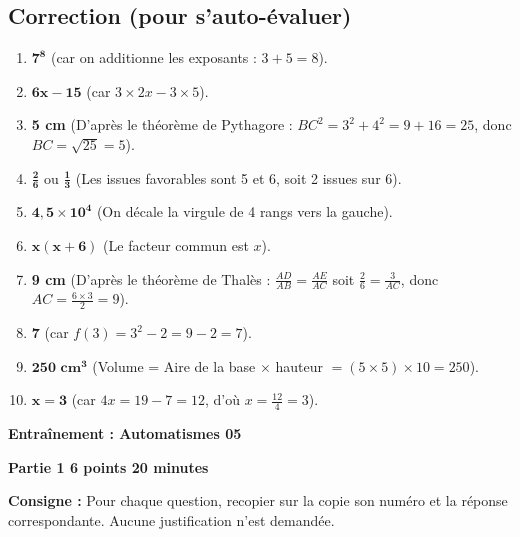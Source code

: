 \documentclass[a4paper,11pt]{article}
\begin{document}
\subsection*{Correction (pour s'auto-évaluer)}
\begin{enumerate}[label=\textbf{\arabic*.}]
    \item $\mathbf{7^8}$ (car on additionne les exposants : $3 + 5 = 8$).
    \item $\mathbf{6x - 15}$ (car $3 \times 2x - 3 \times 5$).
    \item \textbf{5 cm} (D'après le théorème de Pythagore : $BC^2 = 3^2 + 4^2 = 9 + 16 = 25$, donc $BC = \sqrt{25} = 5$).
    \item $\mathbf{\frac{2}{6}}$ ou $\mathbf{\frac{1}{3}}$ (Les issues favorables sont 5 et 6, soit 2 issues sur 6).
    \item $\mathbf{4,5 \times 10^4}$ (On décale la virgule de 4 rangs vers la gauche).
    \item $\mathbf{x(x + 6)}$ (Le facteur commun est $x$).
    \item \textbf{9 cm} (D'après le théorème de Thalès : $\frac{AD}{AB} = \frac{AE}{AC}$ soit $\frac{2}{6} = \frac{3}{AC}$, donc $AC = \frac{6 \times 3}{2} = 9$).
    \item \textbf{7} (car $f(3) = 3^2 - 2 = 9 - 2 = 7$).
    \item $\mathbf{250\text{ cm}^3}$ (Volume = Aire de la base $\times$ hauteur $= (5 \times 5) \times 10 = 250$).
    \item $\mathbf{x = 3}$ (car $4x = 19 - 7 = 12$, d'où $x = \frac{12}{4} = 3$).
\end{enumerate}

\newpage

\begin{center}
    \Large\textbf{Entraînement : Automatismes 05}
\end{center}

\noindent \textbf{Partie 1 \hfill 6 points \hfill 20 minutes}

\medskip
\noindent \textbf{Consigne :} Pour chaque question, recopier sur la copie son numéro et la réponse correspondante. Aucune justification n'est demandée.

\bigskip
\end{document}
